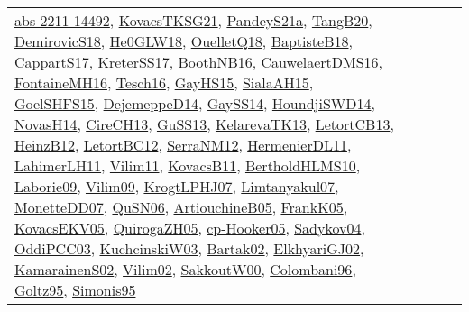 {\begin{longtable}{lp{3cm}>{\raggedright}p{6cm}>{\raggedright}p{6cm}p{8cm}}
\href{articles/abs-2211-14492.pdf}{abs-2211-14492}\cite{abs-2211-14492}, \href{papers/KovacsTKSG21.pdf}{KovacsTKSG21}\cite{KovacsTKSG21}, \href{articles/PandeyS21a.pdf}{PandeyS21a}\cite{PandeyS21a}, \href{papers/TangB20.pdf}{TangB20}\cite{TangB20}, \href{papers/DemirovicS18.pdf}{DemirovicS18}\cite{DemirovicS18}, \href{papers/He0GLW18.pdf}{He0GLW18}\cite{He0GLW18}, \href{papers/OuelletQ18.pdf}{OuelletQ18}\cite{OuelletQ18}, \href{articles/BaptisteB18.pdf}{BaptisteB18}\cite{BaptisteB18}, \href{papers/CappartS17.pdf}{CappartS17}\cite{CappartS17}, \href{articles/KreterSS17.pdf}{KreterSS17}\cite{KreterSS17}, \href{papers/BoothNB16.pdf}{BoothNB16}\cite{BoothNB16}, \href{papers/CauwelaertDMS16.pdf}{CauwelaertDMS16}\cite{CauwelaertDMS16}, \href{papers/FontaineMH16.pdf}{FontaineMH16}\cite{FontaineMH16}, \href{papers/Tesch16.pdf}{Tesch16}\cite{Tesch16}, \href{papers/GayHS15.pdf}{GayHS15}\cite{GayHS15}, \href{papers/SialaAH15.pdf}{SialaAH15}\cite{SialaAH15}, \href{articles/GoelSHFS15.pdf}{GoelSHFS15}\cite{GoelSHFS15}, \href{papers/DejemeppeD14.pdf}{DejemeppeD14}\cite{DejemeppeD14}, \href{papers/GaySS14.pdf}{GaySS14}\cite{GaySS14}, \href{papers/HoundjiSWD14.pdf}{HoundjiSWD14}\cite{HoundjiSWD14}, \href{articles/NovasH14.pdf}{NovasH14}\cite{NovasH14}, \href{papers/CireCH13.pdf}{CireCH13}\cite{CireCH13}, \href{papers/GuSS13.pdf}{GuSS13}\cite{GuSS13}, \href{papers/KelarevaTK13.pdf}{KelarevaTK13}\cite{KelarevaTK13}, \href{papers/LetortCB13.pdf}{LetortCB13}\cite{LetortCB13}, \href{papers/HeinzB12.pdf}{HeinzB12}\cite{HeinzB12}, \href{papers/LetortBC12.pdf}{LetortBC12}\cite{LetortBC12}, \href{papers/SerraNM12.pdf}{SerraNM12}\cite{SerraNM12}, \href{papers/HermenierDL11.pdf}{HermenierDL11}\cite{HermenierDL11}, \href{papers/LahimerLH11.pdf}{LahimerLH11}\cite{LahimerLH11}, \href{papers/Vilim11.pdf}{Vilim11}\cite{Vilim11}, \href{articles/KovacsB11.pdf}{KovacsB11}\cite{KovacsB11}, \href{papers/BertholdHLMS10.pdf}{BertholdHLMS10}\cite{BertholdHLMS10}, \href{papers/Laborie09.pdf}{Laborie09}\cite{Laborie09}, \href{papers/Vilim09.pdf}{Vilim09}\cite{Vilim09}, \href{papers/KrogtLPHJ07.pdf}{KrogtLPHJ07}\cite{KrogtLPHJ07}, \href{papers/Limtanyakul07.pdf}{Limtanyakul07}\cite{Limtanyakul07}, \href{papers/MonetteDD07.pdf}{MonetteDD07}\cite{MonetteDD07}, \href{papers/QuSN06.pdf}{QuSN06}\cite{QuSN06}, \href{papers/ArtiouchineB05.pdf}{ArtiouchineB05}\cite{ArtiouchineB05}, \href{papers/FrankK05.pdf}{FrankK05}\cite{FrankK05}, \href{papers/KovacsEKV05.pdf}{KovacsEKV05}\cite{KovacsEKV05}, \href{papers/QuirogaZH05.pdf}{QuirogaZH05}\cite{QuirogaZH05}, \href{papers/cp-Hooker05.pdf}{cp-Hooker05}\cite{cp-Hooker05}, \href{papers/Sadykov04.pdf}{Sadykov04}\cite{Sadykov04}, \href{papers/OddiPCC03.pdf}{OddiPCC03}\cite{OddiPCC03}, \href{articles/KuchcinskiW03.pdf}{KuchcinskiW03}\cite{KuchcinskiW03}, \href{papers/Bartak02.pdf}{Bartak02}\cite{Bartak02}, \href{papers/ElkhyariGJ02.pdf}{ElkhyariGJ02}\cite{ElkhyariGJ02}, \href{papers/KamarainenS02.pdf}{KamarainenS02}\cite{KamarainenS02}, \href{papers/Vilim02.pdf}{Vilim02}\cite{Vilim02}, \href{articles/SakkoutW00.pdf}{SakkoutW00}\cite{SakkoutW00}, \href{papers/Colombani96.pdf}{Colombani96}\cite{Colombani96}, \href{papers/Goltz95.pdf}{Goltz95}\cite{Goltz95}, \href{papers/Simonis95.pdf}{Simonis95}\cite{Simonis95}\\

\end{longtable}}
